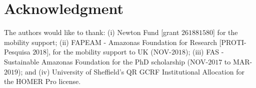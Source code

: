 \documentclass[journal]{IEEEtran}
\begin{document}
\section*{Acknowledgment}

The authors would like to thank: (i) Newton Fund [grant $261881580$] for the mobility support; (ii) FAPEAM - Amazonas Foundation for Research [PROTI-Pesquisa $2018$], for the mobility support to UK (NOV-$2018$); (iii) FAS - Sustainable Amazonas Foundation for the PhD scholarship (NOV-$2017$ to MAR-$2019$); and (iv) University of Sheffield's QR GCRF Institutional Allocation for the HOMER Pro license.

\ifCLASSOPTIONcaptionsoff
  \newpage
\fi




\end{document}
